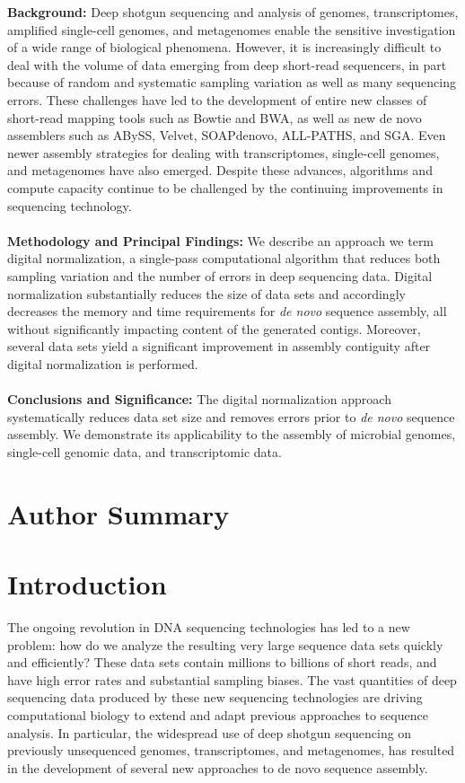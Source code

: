 \documentclass[10pt]{article}
\begin{document}
{\bf Background:} Deep shotgun sequencing and analysis of genomes,
transcriptomes, amplified single-cell genomes, and metagenomes enable
the sensitive investigation of a wide range of biological
phenomena. However, it is increasingly difficult to deal with the volume of data
emerging from deep short-read sequencers, in part because of random
and systematic sampling variation as well as many sequencing errors.
These challenges have led to the development of entire new classes of
short-read mapping tools such as Bowtie and BWA, as well as new de
novo assemblers such as ABySS, Velvet, SOAPdenovo, ALL-PATHS, and SGA.
Even newer assembly strategies for dealing with transcriptomes,
single-cell genomes, and metagenomes have also emerged.  Despite these
advances, algorithms and compute capacity continue to be challenged by
the continuing improvements in sequencing technology.
\\
\\
{\bf Methodology and Principal Findings:} We describe an approach we term
digital normalization, a single-pass computational algorithm that
reduces both sampling variation and the number of errors in deep sequencing data. Digital normalization substantially
reduces the size of data sets and accordingly decreases the memory and time
requirements for {\em de novo} sequence assembly, all without significantly
impacting content of the generated contigs.  Moreover, several data sets
yield a significant improvement in assembly contiguity after digital normalization
is performed.
\\
\\
{\bf Conclusions and Significance:} The digital normalization approach
systematically reduces data set size and removes errors prior to {\em
de novo} sequence assembly.  We demonstrate its
applicability to the assembly of microbial genomes, single-cell
genomic data, and transcriptomic data.

\section*{Author Summary}

\section*{Introduction}

The ongoing revolution in DNA sequencing technologies has led to a new
problem: how do we analyze the resulting very large sequence data sets
quickly and efficiently? These data sets contain millions to billions
of short reads, and have high error rates and substantial sampling
biases.  The vast quantities of deep sequencing data produced by
these new sequencing technologies are driving
computational biology to extend and adapt previous approaches to sequence
analysis.  In
particular, the widespread use of deep shotgun sequencing on
previously unsequenced genomes, transcriptomes, and metagenomes, has
resulted in the development of several new approaches to de novo
sequence assembly.
\end{document}
